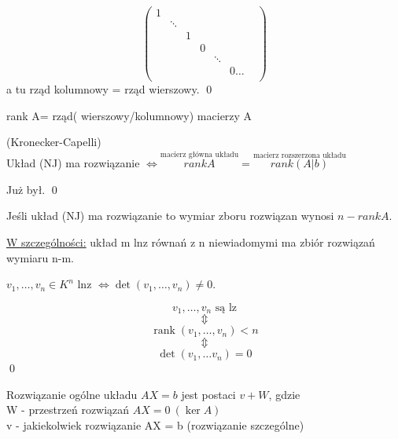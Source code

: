\begin{dd}
\begin{enumerate}[{(}1{)}]
$$        \begin{pmatrix}
        1 & & & & & & \\ 
        & \ddots & & & & &  \\
        & & 1 & & & & \\
        & & & 0 & & & \\ 
        & & & & \ddots & & \\ 
        & & & & & 0 \dots \\
        \end{pmatrix} 
        $$
        a tu rząd kolumnowy = rząd wierszowy. \qed
    \end{enumerate}
\end{dd} 

\begin{ozn}
    rank A= rząd( wierszowy/kolumnowy) macierzy A
\end{ozn} 

\begin{tw} (Kronecker-Capelli) \\ 
    Układ (NJ) ma rozwiązanie $\Leftrightarrow \overset{\text{macierz główna układu}}{rank A} = \overset{\text{macierz rozszerzona układu}}{rank(A|b)}$
\end{tw}

\begin{dd}
    Już był. \qed
\end{dd}

\begin{tw}
    Jeśli układ (NJ) ma rozwiązanie to wymiar zboru rozwiązan wynosi $n - rank A$. 
\end{tw}
\underline{W szczególności:} układ m lnz równań z n niewiadomymi ma zbiór rozwiązań wymiaru n-m.

\begin{ft}
    $v_1,\dots,v_n \in K ^n $ lnz $ \Leftrightarrow \det(v_1,\dots,v_n) \neq 0$.
\end{ft}
\begin{dd} 
    $$ v_1, \ldots, v_n \text{ są lz}$$
    $$\Updownarrow$$ 
    $$ \operatorname{rank} (v_1, \dots , v_n) < n $$  
   $$ \Updownarrow $$  
   $$ \det (v_1,\dots v_n) = 0 $$ \hfill \qed 
\end{dd} 

\begin{tw} Rozwiązanie ogólne układu $AX = b$ jest postaci $v + W$, gdzie \\
    W - przestrzeń rozwiązań $AX = 0 \ (\ker A)$\\ 
    v - jakiekolwiek rozwiązanie AX = b (rozwiązanie szczególne)
\end{tw} 
